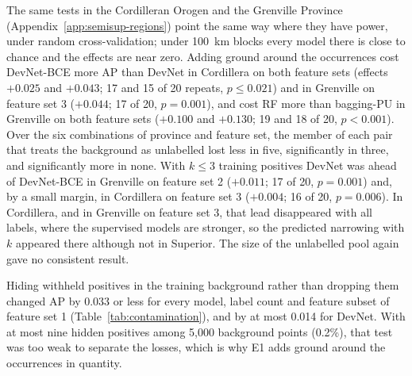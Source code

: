 \documentclass[pdflatex,sn-apa]{sn-jnl}
\begin{document}
The same tests in the Cordilleran Orogen and the Grenville Province (Appendix~\ref{app:semisup-regions}) point the same way where they have power, under random cross-validation; under 100~km blocks every model there is close to chance and the effects are near zero. Adding ground around the occurrences cost DevNet-BCE more AP than DevNet in Cordillera on both feature sets (effects $+0.025$ and $+0.043$; 17 and 15 of 20 repeats, $p \leq 0.021$) and in Grenville on feature set 3 ($+0.044$; 17 of 20, $p = 0.001$), and cost RF more than bagging-PU in Grenville on both feature sets ($+0.100$ and $+0.130$; 19 and 18 of 20, $p < 0.001$). Over the six combinations of province and feature set, the member of each pair that treats the background as unlabelled lost less in five, significantly in three, and significantly more in none. With $k \leq 3$ training positives DevNet was ahead of DevNet-BCE in Grenville on feature set 2 ($+0.011$; 17 of 20, $p = 0.001$) and, by a small margin, in Cordillera on feature set 3 ($+0.004$; 16 of 20, $p = 0.006$). In Cordillera, and in Grenville on feature set 3, that lead disappeared with all labels, where the supervised models are stronger, so the predicted narrowing with $k$ appeared there although not in Superior. The size of the unlabelled pool again gave no consistent result.

Hiding withheld positives in the training background rather than dropping them changed AP by 0.033 or less for every model, label count and feature subset of feature set 1 (Table~\ref{tab:contamination}), and by at most 0.014 for DevNet. With at most nine hidden positives among 5,000 background points (0.2\%), that test was too weak to separate the losses, which is why E1 adds ground around the occurrences in quantity.
\end{document}
